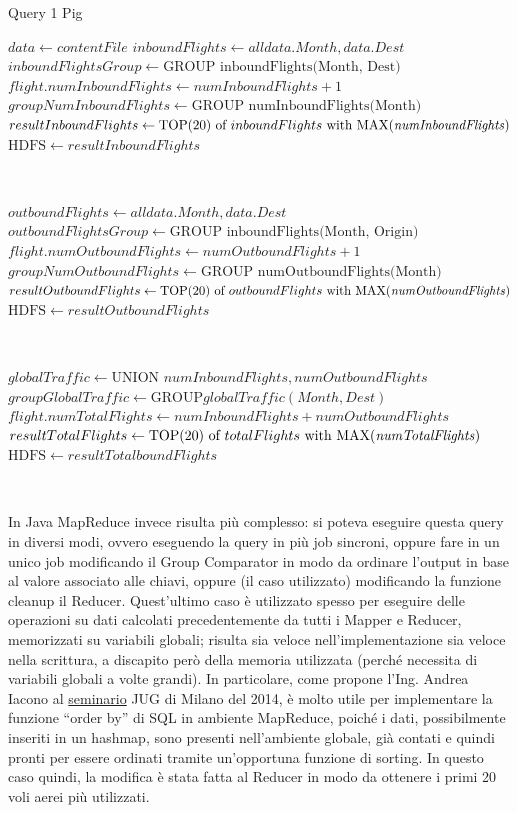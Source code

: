 \documentclass[11pt]{article} %
\begin{document}
\begin{algorithm}
\caption{Query 1 Pig}\label{euclid}
\begin{algorithmic}[0]
\State $data \gets contentFile$
\State $inboundFlights \gets all data.Month, data.Dest$
\State $inboundFlightsGroup \gets \text{GROUP inboundFlights(Month, Dest)}$
\State $flight.numInboundFlights \gets numInboundFlights+1$
\EndFor
\State $groupNumInboundFlights \gets \text{GROUP numInboundFlights(Month)}$
\State $resultInboundFlights \gets \text{TOP(20) of }inboundFlights \text{ with MAX(\textit{numInboundFlights})}$
\State $\text{HDFS}\gets resultInboundFlights$

~

\State $outboundFlights \gets all data.Month, data.Dest$
\State $outboundFlightsGroup \gets \text{GROUP inboundFlights(Month, Origin)}$
\State $flight.numOutboundFlights \gets numOutboundFlights+1$
\EndFor
\State $groupNumOutboundFlights \gets \text{GROUP numOutboundFlights(Month)}$
\State $resultOutboundFlights \gets \text{TOP(20) of }outboundFlights \text{ with MAX(\textit{numOutboundFlights})}$
\State $\text{HDFS}\gets resultOutboundFlights$

~

\State $globalTraffic \gets \text{UNION } numInboundFlights, numOutboundFlights$
\State $groupGlobalTraffic \gets \text{GROUP}globalTraffic(Month, Dest)$
\State $flight.numTotalFlights \gets numInboundFlights+ numOutboundFlights$
\EndFor
\State $resultTotalFlights \gets \text{TOP(20) of }totalFlights \text{ with MAX(\textit{numTotalFlights})}$
\State $\text{HDFS}\gets resultTotalboundFlights$

\end{algorithmic}
\end{algorithm}


~

In Java MapReduce invece risulta più complesso: si poteva eseguire questa query in diversi modi, ovvero eseguendo la query in più job sincroni, oppure fare in un unico job modificando il Group Comparator in modo da ordinare l'output in base al valore associato alle chiavi, oppure (il caso utilizzato) modificando la funzione cleanup il Reducer. Quest'ultimo caso è utilizzato spesso per eseguire delle operazioni su dati calcolati precedentemente da tutti i Mapper e Reducer, memorizzati su variabili globali; risulta sia veloce nell'implementazione sia veloce nella scrittura, a discapito però della memoria utilizzata (perché necessita di variabili globali a volte grandi). In particolare, come propone l'Ing. Andrea Iacono al \href{http://www.slideshare.net/andreaiacono/mapreduce-34478449}{seminario} JUG di Milano del 2014, è molto utile per implementare la funzione ``order by'' di SQL in ambiente MapReduce, poiché i dati, possibilmente inseriti in un hashmap, sono presenti nell'ambiente globale, già contati e quindi pronti per essere ordinati tramite un'opportuna funzione di sorting. In questo caso quindi, la modifica è stata fatta al Reducer in modo da ottenere i primi 20 voli aerei più utilizzati.
\end{document}
